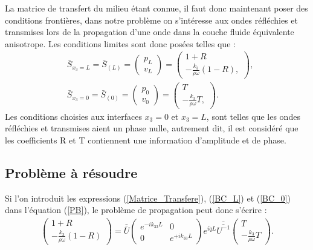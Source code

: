 \documentclass[12pt]{report}
\begin{document}
    La matrice de transfert du milieu étant connue, il faut donc maintenant poser des conditions frontières, dans notre problème on s'intéresse aux ondes réfléchies et transmises lors de la propagation d'une onde dans la couche fluide équivalente anisotrope. Les conditions limites sont donc posées telles que :
    \begin{align}
    &\bar{S}_{x_3=L}=\bar{S}_{(L)}=\begin{pmatrix}
    						p_L \\ v_L
    					\end{pmatrix} = \begin{pmatrix}
    										1+R \\ -\frac{k_3}{\rho \omega}(1-R),
    									\end{pmatrix},\label{BC_L} \\
  	&\bar{S}_{x_3=0}=\bar{S}_{(0)}=\begin{pmatrix}
    						p_0 \\ v_0
    					\end{pmatrix} =\begin{pmatrix}
    						T \\ -\frac{k_3}{\rho \omega}T,
    					\end{pmatrix}.\label{BC_0}
    \end{align}    
     Les conditions choisies aux interfaces $x_3=0$ et $x_3=L$, sont telles que les ondes réfléchies et transmises aient un phase nulle, autrement dit, il est considéré que les coefficients R et T contiennent une information d'amplitude et de phase.    
        
\subsection{Problème à résoudre}    
    Si l'on introduit les expressions (\ref{Matrice_Transfere}), (\ref{BC_L}) et (\ref{BC_0}) dans l'équation (\ref{PB}), le problème de propagation peut donc s'écrire :
    \begin{align}
        \begin{pmatrix}
    	    1+R \\ -\frac{k_3}{\rho \omega}(1-R)
    	\end{pmatrix}=\bar{\bar{U}}\begin{pmatrix}
                        e^{-ik_{33}L} & 0 \\ 0 & e^{+ik_{33}L} 
                      \end{pmatrix} e^{i\tilde{q}L}\bar{\bar{U^{-1}}}\begin{pmatrix}
    					                            	T \\ -\frac{k_3}{\rho \omega}T
    				                                        	\end{pmatrix}.\label{Eq_Prop}
    \end{align}
\end{document}
